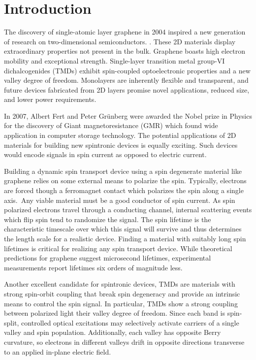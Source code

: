 \chapter{Introduction}

The discovery of single-atomic layer graphene in 2004
inspired a new generation of research on two-dimensional semiconductors.
\cite{Novoselov666}.
These 2D materials display extraordinary properties not present in the bulk.
Graphene boasts high electron mobility and exceptional strength.
Single-layer transition metal group-VI dichalcogenides (TMDs)
exhibit spin-coupled optoelectronic properties
and a new valley degree of freedom.
Monolayers are inherently flexible and transparent,
and future devices fabricated from 2D layers promise
novel applications, reduced size, and lower power requirements.

In 2007, Albert Fert and Peter Grünberg were awarded
the Nobel prize in Physics for the discovery of
Giant magnetoresistance (GMR)
which found wide application in computer storage technology.
The potential applications of 2D materials for
building new spintronic devices is equally exciting.
Such devices would encode signals in spin current
as opposed to electric current.

Building a dynamic spin transport device using a
spin degenerate material like graphene
relies on some external means to polarize the spin.
Typically, electrons are forced though a ferromagnet contact
which polarizes the spin along a single axis.\
Any viable material must be a good conductor of spin current.
As spin polarized electrons travel through a conducting channel,
internal scattering events which flip spin tend to randomize the signal.
The spin lifetime is the characteristic timescale
over which this signal will survive
and thus determines the length scale for a realistic device.
Finding a material with suitably long spin lifetimes
is critical for realizing any spin transport device.
While theoretical predictions for graphene suggest microsecond lifetimes,
experimental measurements report lifetimes six orders of magnitude less.

Another excellent candidate for spintronic devices,
TMDs are materials with strong spin-orbit coupling that break spin degeneracy
and provide an intrinsic means to control the spin signal.
In particular, TMDs show a strong coupling
between polarized light their valley degree of freedom.
Since each band is spin-split, controlled optical excitations
may selectively activate carriers of a single valley and spin population.
Additionally, each valley has opposite Berry curvature, so
electrons in different valleys drift in opposite directions transverse
to an applied in-plane electric field.

